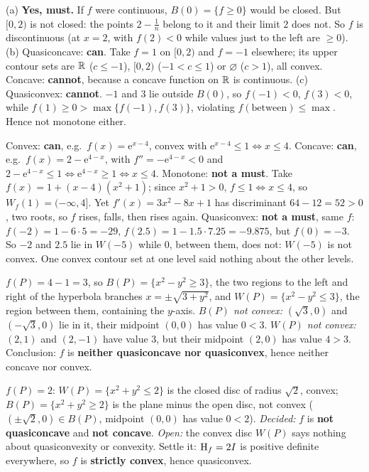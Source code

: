 \begin{solutions}
  \item (a) \textbf{Yes, must.} If $f$ were continuous,
        $B(0)=\{f\ge0\}$ would be closed. But $[0,2)$ is not closed: the
        points $2-\tfrac1n$ belong to it and their limit $2$ does not. So
        $f$ is discontinuous (at $x=2$, with $f(2)<0$ while values just to
        the left are $\ge0$).
        (b) Quasiconcave: \textbf{can}. Take $f=1$ on $[0,2)$ and $f=-1$
        elsewhere; its upper contour sets are $\mathbb{R}$ ($c\le-1$), $[0,2)$
        ($-1<c\le1$) or $\varnothing$ ($c>1$), all convex. Concave:
        \textbf{cannot}, because a concave function on $\mathbb{R}$ is continuous.
        (c) Quasiconvex: \textbf{cannot}. $-1$ and $3$ lie outside $B(0)$,
        so $f(-1)<0$, $f(3)<0$, while $f(1)\ge0>\max\{f(-1),f(3)\}$,
        violating $f(\text{between})\le\max$. Hence not monotone either.

  \item Convex: \textbf{can}, e.g.\ $f(x)=\mathrm{e}^{x-4}$, convex with
        $\mathrm{e}^{x-4}\le1\iff x\le4$. Concave: \textbf{can}, e.g.\
        $f(x)=2-\mathrm{e}^{4-x}$, with $f''=-\mathrm{e}^{4-x}<0$ and
        $2-\mathrm{e}^{4-x}\le1\iff\mathrm{e}^{4-x}\ge1\iff x\le4$.
        Monotone: \textbf{not a must}. Take
        $f(x)=1+(x-4)(x^{2}+1)$; since $x^{2}+1>0$, $f\le1\iff x\le4$, so
        $W_f(1)=(-\infty,4]$. Yet $f'(x)=3x^{2}-8x+1$ has discriminant
        $64-12=52>0$, two roots, so $f$ rises, falls, then rises again.
        Quasiconvex: \textbf{not a must}, same $f$: $f(-2)=1-6\cdot5=-29$,
        $f(2.5)=1-1.5\cdot7.25=-9.875$, but $f(0)=-3$. So $-2$ and $2.5$
        lie in $W(-5)$ while $0$, between them, does not: $W(-5)$ is not
        convex. One convex contour set at one level said nothing about the
        other levels.

  \item $f(P)=4-1=3$, so $B(P)=\{x^{2}-y^{2}\ge3\}$, the two regions
        to the left and right of the hyperbola branches $x=\pm\sqrt{3+y^{2}}$,
        and $W(P)=\{x^{2}-y^{2}\le3\}$, the region between them, containing
        the $y$-axis. \emph{$B(P)$ not convex:} $(\sqrt3,0)$ and
        $(-\sqrt3,0)$ lie in it, their midpoint $(0,0)$ has value
        $0<3$. \emph{$W(P)$ not convex:} $(2,1)$ and $(2,-1)$ have value
        $3$, but their midpoint $(2,0)$ has value $4>3$. Conclusion: $f$ is
        \textbf{neither quasiconcave nor quasiconvex}, hence neither concave
        nor convex.

  \item $f(P)=2$: $W(P)=\{x^{2}+y^{2}\le2\}$ is the closed disc of radius
        $\sqrt2$, convex; $B(P)=\{x^{2}+y^{2}\ge2\}$ is the plane minus the
        open disc, not convex ($(\pm\sqrt2,0)\in B(P)$, midpoint $(0,0)$
        has value $0<2$). \emph{Decided:} $f$ is \textbf{not quasiconcave}
        and \textbf{not concave}. \emph{Open:} the convex disc $W(P)$ says
        nothing about quasiconvexity or convexity. Settle it: $\operatorname{H}_f=2I$
        is positive definite everywhere, so $f$ is \textbf{strictly
        convex}, hence quasiconvex.


\end{solutions}
